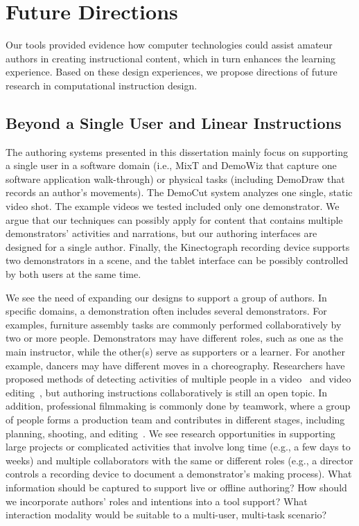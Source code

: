 \section{Future Directions} %

Our tools provided evidence how computer technologies could assist amateur authors in creating instructional content, which in turn enhances the learning experience. Based on these design experiences, we propose directions of future research in computational instruction design.

\subsection{Beyond a Single User and Linear Instructions}
The authoring systems presented in this dissertation mainly focus on supporting a single user in a software domain (i.e., MixT and DemoWiz that capture one software application walk-through) or physical tasks (including DemoDraw that records an author's movements).
%
The DemoCut system analyzes one single, static video shot. The example videos we tested included only one demonstrator. We argue that our techniques can possibly apply for content that contains multiple demonstrators' activities and narrations, but our authoring interfaces are designed for a single author.
%
Finally, the Kinectograph recording device supports two demonstrators in a scene, and the tablet interface can be possibly controlled by both users at the same time.

We see the need of expanding our designs to support a group of authors. In specific domains, a demonstration often includes several demonstrators. For examples, furniture assembly tasks are commonly performed collaboratively by two or more people. Demonstrators may have different roles, such as one as the main instructor, while the other(s) serve as supporters or a learner. For another example, dancers may have different moves in a choreography.
%
Researchers have proposed methods of detecting activities of multiple people in a video~\cite{dou-siggraph2016} and video editing~\cite{PatelUIST16}, but authoring instructions collaboratively is still an open topic.
%
In addition, professional filmmaking is commonly done by teamwork, where a group of people forms a production team and contributes in different stages, including planning, shooting, and editing~\cite{pincus2012the}. We see research opportunities in supporting large projects or complicated activities that involve long time (e.g., a few days to weeks) and multiple collaborators with the same or different roles (e.g., a director controls a recording device to document a demonstrator's making process).
What information should be captured to support live or offline authoring? How should we incorporate authors' roles and intentions into a tool support? What interaction modality would be suitable to a multi-user, multi-task scenario?

